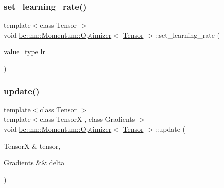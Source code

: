 \mbox{\label{structbc_1_1nn_1_1Momentum_1_1Optimizer_ada29fdc99e684aceb5a15ca458554c22}} 
\subsubsection{\texorpdfstring{set\+\_\+learning\+\_\+rate()}{set\_learning\_rate()}}
{\footnotesize\ttfamily template$<$class Tensor $>$ \\
void \hyperlink{structbc_1_1nn_1_1Momentum_1_1Optimizer}{bc\+::nn\+::\+Momentum\+::\+Optimizer}$<$ \hyperlink{namespacebc_a659391e47ab612be3ba6c18cf9c89159}{Tensor} $>$\+::set\+\_\+learning\+\_\+rate (\begin{DoxyParamCaption}\item[{\hyperlink{structbc_1_1nn_1_1Momentum_1_1Optimizer_a53cb161fe0dd2fa29c1647d36e424d35}{value\+\_\+type}}]{lr }\end{DoxyParamCaption})\hspace{0.3cm}{\ttfamily [inline]}}

\mbox{\label{structbc_1_1nn_1_1Momentum_1_1Optimizer_a93b6491d017c68b34a6aa7dcd5ab583f}} 
\subsubsection{\texorpdfstring{update()}{update()}}
{\footnotesize\ttfamily template$<$class Tensor $>$ \\
template$<$class TensorX , class Gradients $>$ \\
void \hyperlink{structbc_1_1nn_1_1Momentum_1_1Optimizer}{bc\+::nn\+::\+Momentum\+::\+Optimizer}$<$ \hyperlink{namespacebc_a659391e47ab612be3ba6c18cf9c89159}{Tensor} $>$\+::update (\begin{DoxyParamCaption}\item[{TensorX \&}]{tensor,  }\item[{Gradients \&\&}]{delta }\end{DoxyParamCaption})\hspace{0.3cm}{\ttfamily [inline]}}



